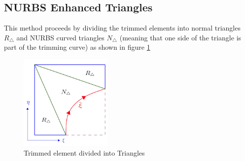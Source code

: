 \documentclass[12pt, a4paper]{report}
\begin{document}
\subsection{NURBS Enhanced Triangles}
This method \cite{trim_element_iga} proceeds by dividing the trimmed elements into normal triangles $R_{\triangle}$ and NURBS curved triangles $N_{\triangle}$ (meaning that one side of the triangle is part of the trimming curve) as shown in figure \ref{fig:NURBS_ENHANCED_TRIANGLE}
\begin{figure}[H]
\centering
\includegraphics[width=0.4\textwidth]{Images/nurbs_en_tri.jpg}
\caption{Trimmed element divided into Triangles }
\label{fig:NURBS_ENHANCED_TRIANGLE}
\end{figure}
\end{document}
